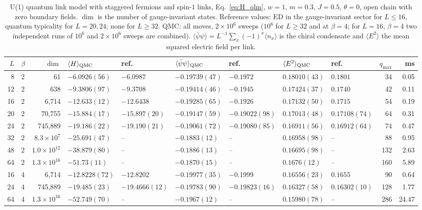 \begin{table}[t]
\caption{U(1) quantum link model with staggered fermions and spin-$1$ links, Eq.~\eqref{eq:H_qlm}, $w=1$, $m=0.3$, $J=0.5$, $\theta=0$, open chain with zero boundary fields. $\dim$ is the number of gauge-invariant states. Reference values: ED in the gauge-invariant sector for $L\le16$, quantum typicality for $L=20,24$; none for $L\ge32$. QMC: all moves, $2\times10^6$ sweeps ($10^6$ for $L\ge32$ and at $\beta=4$; for $L=16$, $\beta=4$ two independent runs of $10^6$ and $2\times10^6$ sweeps are combined). $\langle\bar\psi\psi\rangle=L^{-1}\sum_x(-1)^x\langle n_x\rangle$ is the chiral condensate and $\langle E^2\rangle$ the mean squared electric field per link.}
\label{tab:qlm}
\small
\begin{tabular}{r l r|ll|ll|ll|r|r}
\hline\hline
$L$ & $\beta$ & $\dim$ & $\langle H\rangle_{\rm QMC}$ & ref. & $\langle\bar\psi\psi\rangle_{\rm QMC}$ & ref. & $\langle E^2\rangle_{\rm QMC}$ & ref. & $q_{\max}$ & ms\\
\hline
8 & 2 & 61 & $-6.0926(56)$ & $-6.0987$ & $-0.19739(47)$ & $-0.1972$ & $0.18010(43)$ & $0.1801$ & 34 & 0.05 \\
12 & 2 & 638 & $-9.3806(97)$ & $-9.3708$ & $-0.19414(46)$ & $-0.1945$ & $0.17424(37)$ & $0.1740$ & 42 & 0.11 \\
16 & 2 & 6{,}714 & $-12.633(12)$ & $-12.6438$ & $-0.19285(65)$ & $-0.1926$ & $0.17132(50)$ & $0.1715$ & 54 & 0.19 \\
20 & 2 & 70{,}755 & $-15.884(17)$ & $-15.897(20)$ & $-0.19147(59)$ & $-0.19022(98)$ & $0.17013(48)$ & $0.17108(74)$ & 64 & 0.31 \\
24 & 2 & 745{,}889 & $-19.186(22)$ & $-19.190(21)$ & $-0.19061(72)$ & $-0.19080(85)$ & $0.16911(56)$ & $0.16912(64)$ & 74 & 0.47 \\
32 & 2 & $8.3\times10^{7}$ & $-25.691(47)$ & -- & $-0.1883(12)$ & -- & $0.16958(98)$ & -- & 88 & 0.95 \\
48 & 2 & $1.0\times10^{12}$ & $-38.879(80)$ & -- & $-0.1886(13)$ & -- & $0.16695(98)$ & -- & 132 & 2.63 \\
64 & 2 & $1.3\times10^{16}$ & $-51.73(11)$ & -- & $-0.1870(15)$ & -- & $0.1676(12)$ & -- & 160 & 5.89 \\
16 & 4 & 6{,}714 & $-12.8228(72)$ & $-12.8202$ & $-0.19977(35)$ & $-0.1999$ & $0.16556(23)$ & $0.1655$ & 90 & 0.64 \\
24 & 4 & 745{,}889 & $-19.485(23)$ & $-19.4666(12)$ & $-0.19783(90)$ & $-0.19823(16)$ & $0.16327(58)$ & $0.16302(10)$ & 128 & 1.77 \\
64 & 4 & $1.3\times10^{16}$ & $-52.749(70)$ & -- & $-0.1967(12)$ & -- & $0.15980(78)$ & -- & 286 & 24.47 \\
\hline\hline
\end{tabular}
\end{table}

